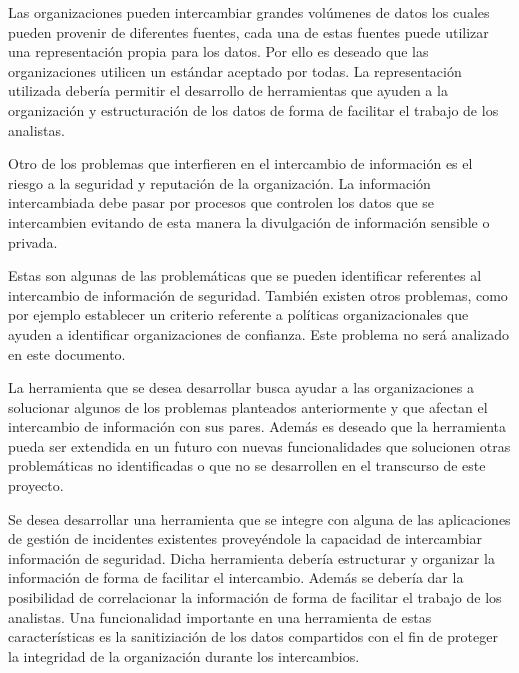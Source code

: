 \documentclass[11pt]{article}
\begin{document}
{
Las organizaciones pueden intercambiar grandes volúmenes de datos los cuales pueden provenir de diferentes fuentes, cada
una de estas fuentes puede utilizar una representación propia para los datos. Por ello es deseado que las
organizaciones utilicen un estándar aceptado por todas. La representación utilizada debería permitir el desarrollo de
herramientas que ayuden a la organización y estructuración de los datos de forma de facilitar el trabajo de los
analistas.}

{
Otro de los problemas que interfieren en el intercambio de información es el riesgo a la seguridad y reputación de la
organización. La información intercambiada debe pasar por procesos que controlen los datos que se intercambien evitando
de esta manera la divulgación de información sensible o privada.}

{
Estas son algunas de las problemáticas que se pueden identificar referentes al intercambio de información de seguridad.
También existen otros problemas, como por ejemplo establecer un criterio referente a políticas organizacionales que
ayuden a identificar organizaciones de confianza. Este problema no será analizado en este documento. }


\bigskip

{
La herramienta que se desea desarrollar busca ayudar a las organizaciones a solucionar algunos de los problemas
planteados anteriormente y que afectan el intercambio de información con sus pares. Además es deseado que la
herramienta pueda ser extendida en un futuro con nuevas funcionalidades que solucionen otras problemáticas no
identificadas o que no se desarrollen en el transcurso de este proyecto.}


\bigskip

{
Se desea desarrollar una herramienta que se integre con alguna de las aplicaciones de gestión de incidentes existentes
proveyéndole la capacidad de intercambiar información de seguridad. Dicha herramienta debería estructurar y organizar
la información de forma de facilitar el intercambio. Además se debería dar la posibilidad de correlacionar la
información de forma de facilitar el trabajo de los analistas. Una funcionalidad importante en una herramienta de estas
características es la sanitiziación de los datos compartidos con el fin de proteger la integridad de la organización
durante los intercambios.}


\bigskip
\end{document}
